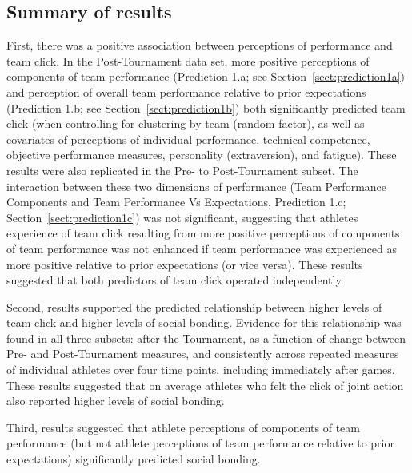 \begin{CJK}{UTF8}{gbsn}
\subsection{Summary of results}

First, there was a positive association between perceptions of performance and team click.  In the Post-Tournament data set, more positive perceptions of components of team performance (Prediction 1.a; see Section~\ref{sect:prediction1a}) and perception of overall team performance relative to prior expectations (Prediction 1.b; see Section~\ref{sect:prediction1b}) both significantly predicted team click (when controlling for clustering by team (random factor), as well as covariates of perceptions of individual performance, technical competence, objective performance measures, personality (extraversion), and fatigue).  These results were also replicated in the Pre- to Post-Tournament subset. The interaction between these two dimensions of performance (Team Performance Components and Team Performance Vs Expectations, Prediction 1.c; Section~\ref{sect:prediction1c}) was not significant, suggesting that athletes experience of team click resulting from more positive perceptions of components of team performance was not enhanced if   team performance was experienced as more positive relative to prior expectations (or vice versa).  These results suggested that both predictors of team click operated independently.


Second, results supported the predicted relationship between higher levels of team click and higher levels of social bonding.  Evidence for this relationship was found in all three subsets: after the Tournament, as a function of change between Pre- and Post-Tournament measures, and consistently across repeated measures of individual athletes over four time points, including immediately after games.  These results suggested that on average athletes who felt the click of joint action also reported higher levels of social bonding.


Third, results suggested that athlete perceptions of components of team performance (but not athlete perceptions of team performance relative to prior expectations) significantly predicted social bonding.


\end{CJK}
